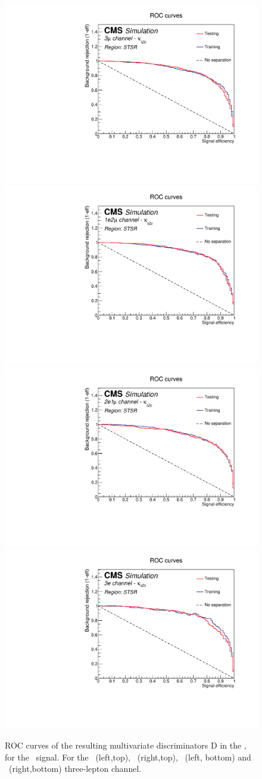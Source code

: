 \begin{figure}[htbp]
	\centering
	\includegraphics[width=0.49\linewidth]{6_Search/Figures/PlotsTechnics/ROCZctsingletopuuu}
	\includegraphics[width=0.49\linewidth]{6_Search/Figures/PlotsTechnics/ROCZctsingletopuue}
	\includegraphics[width=0.49\linewidth]{6_Search/Figures/PlotsTechnics/ROCZctsingletopeeu}
	\includegraphics[width=0.49\linewidth]{6_Search/Figures/PlotsTechnics/ROCZctsingletopeee}
	\caption{ROC curves of the resulting  multivariate discriminators D in the \STSR, for the \Zct\ signal. For the \mumumu\ (left,top), \emumu\ (right,top), \eemu\ (left, bottom) and \eee\ (right,bottom) three-lepton channel.}
	\label{fig:roczctsingletop}
\end{figure}

